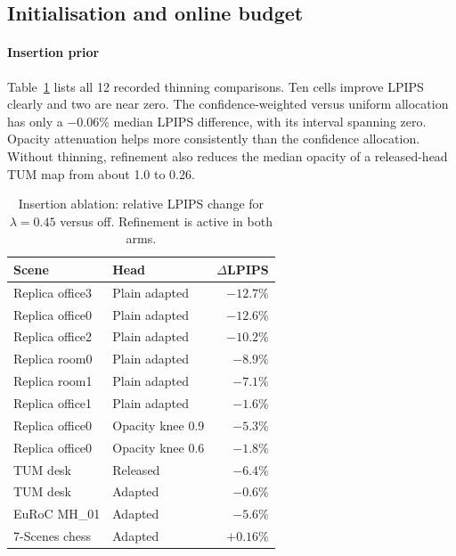 \subsection{Initialisation and online budget}
\paragraph{Insertion prior}
Table~\ref{tab:thinning} lists all 12 recorded thinning comparisons.
Ten cells improve LPIPS clearly and two are near zero.
The confidence-weighted versus uniform allocation has only a
$-0.06\%$ median LPIPS difference, with its interval spanning zero.
Opacity attenuation helps more consistently than the confidence allocation.
Without thinning, refinement also reduces the median opacity of a
released-head TUM map from about 1.0 to 0.26.

\begin{table}[t]
  \centering
  \caption{Insertion ablation: relative LPIPS change for
  $\lambda=0.45$ versus off. Refinement is active in both arms.}
  \label{tab:thinning}
  \small\setlength{\tabcolsep}{4pt}
  \begin{tabular}{@{}llr@{}}
    \toprule
    Scene & Head & $\Delta$LPIPS\\
    \midrule
    Replica office3 & Plain adapted & $-12.7\%$\\
    Replica office0 & Plain adapted & $-12.6\%$\\
    Replica office2 & Plain adapted & $-10.2\%$\\
    Replica room0 & Plain adapted & $-8.9\%$\\
    Replica room1 & Plain adapted & $-7.1\%$\\
    Replica office1 & Plain adapted & $-1.6\%$\\
    Replica office0 & Opacity knee 0.9 & $-5.3\%$\\
    Replica office0 & Opacity knee 0.6 & $-1.8\%$\\
    TUM desk & Released & $-6.4\%$\\
    TUM desk & Adapted & $-0.6\%$\\
    EuRoC MH\_01 & Adapted & $-5.6\%$\\
    7-Scenes chess & Adapted & $+0.16\%$\\
    \bottomrule
  \end{tabular}
\end{table}

